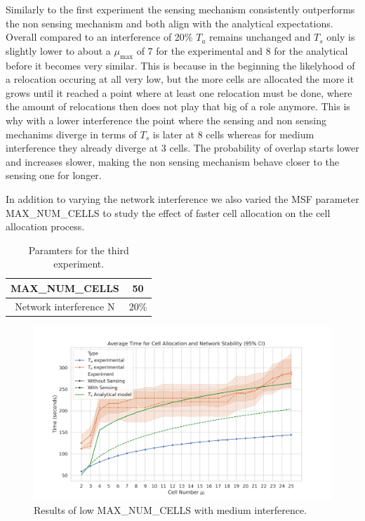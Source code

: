 \documentclass{comnets-thesis}
\begin{document}
Similarly to the first experiment the sensing mechanism consistently outperforms the non sensing mechanism and both align with the analytical expectations. Overall compared to an interference of 20\% $T_a$ remains unchanged and $T_s$ only is slightly lower to about a $\mu_{\max}$ of 7 for the experimental and 8 for the analytical before it becomes very similar. This is because in the beginning the likelyhood of a relocation occuring at all very low, but the more cells are allocated the more it grows until it reached a point where at least one relocation must be done, where the amount of relocations then does not play that big of a role anymore. 
This is why with a lower interference the point where the sensing and non sensing mechanims diverge in terms of $T_s$ is later at 8 cells whereas for medium interference they already diverge at 3 cells. The probability of overlap starts lower and increases slower, making the non sensing mechanism behave closer to the sensing one for longer.


In addition to varying the network interference we also varied the \ac{MSF} parameter MAX\_NUM\_CELLS to study the effect of faster cell allocation on the cell allocation process.

\begin{table}[h]
    \centering
    \caption{Paramters for the third experiment.}
    \begin{tabular}{|c|c|}
    \hline
    MAX\_NUM\_CELLS & 50 \\ \hline
    Network interference N & 20\%  \\ \hline
    \end{tabular}
\end{table}

\begin{figure}[H]
    \centering
    \includegraphics[width=1\textwidth]{./images/experiment3.png}
    \caption{Results of low MAX\_NUM\_CELLS with medium interference.}
    \label{fig:experiment-3}
\end{figure}
\end{document}
